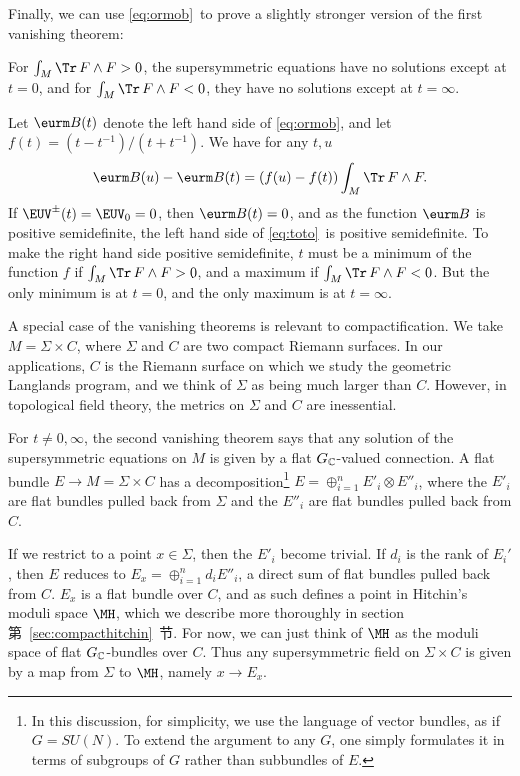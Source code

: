 Finally, we can use \eqref{eq:ormob}\ to prove a slightly stronger version
of the first vanishing theorem:

\par{} For $\int_M\Tr\,
F\wedge F>0$, the supersymmetric equations have no solutions
except at $t=0$, and for $\int_M\Tr\,F\wedge F<0$, they have no
solutions except at $t=\infty$.\par\medskip

Let ${\eurm B}(t)$ denote the left hand side of \eqref{eq:ormob}, and let
$f(t)=(t-t^{-1})/(t+t^{-1})$.  We have for any $t,u$
\setcounter{equation}{33}
\begin{equation}\label{eq:toto}
{\eurm B}(u)-{\eurm B}(t)=(f(u)-f(t))\int_M\Tr \,F\wedge
F.
\end{equation}
 If $\EUV^\pm(t)=\EUV_0=0$, then ${\eurm B}(t)=0$, and as the
function ${\eurm B}$ is positive semidefinite, the left hand side
of \eqref{eq:toto}\ is positive semidefinite. To make the right hand side
positive semidefinite, $t$ must be a minimum of the function $f$
if $\int_M\Tr\, F\wedge F>0$, and a maximum if $\int_M\Tr\,F\wedge
F<0$.  But the only minimum is at $t=0$, and the only maximum is
at $t=\infty$.

\par{}

A special case of the vanishing theorems  is relevant to
compactification.  We take $M=\Sigma\times C$, where $\Sigma$ and
$C$ are two compact Riemann surfaces.  In our applications, $C$ is
the Riemann surface on which we study the geometric Langlands
program, and we think of $\Sigma$ as being much larger than $C$.
However, in topological field theory, the metrics on $\Sigma$ and
$C$ are inessential.

For $t\not=0,\infty$, the second vanishing theorem says that any
solution of the supersymmetric equations on $M$ is given by a flat
$G_{\Bbb{C}}$-valued connection.  A flat bundle $E\to
M=\Sigma\times C$ has a decomposition\footnote{In this discussion, for
simplicity, we use the language of vector bundles, as if
$G=SU(N)$. To extend the argument to any $G$, one simply
formulates it in terms of subgroups of $G$ rather than subbundles
of $E$.} $E=\oplus_{i=1}^n E'_i\otimes E''_i$, where the $E'_i$
are flat bundles pulled back from  $\Sigma$ and the $E''_i$ are
flat bundles pulled back from $C$.

If we restrict to a point $x\in \Sigma$, then the $E'_i$ become
trivial. If $d_i$ is the rank of $E_i'$, then $E$ reduces to
$E_x=\oplus_{i=1}^n d_iE''_i$, a direct sum of flat bundles pulled
back from $C$. $E_x$ is a flat bundle over $C$, and as such
defines a point in Hitchin's moduli space $\MH$, which we describe
more thoroughly in section 第~\ref{sec:compacthitchin}~节. For now, we can just think of $\MH$ as the
moduli space of flat $G_\Bbb{C}$-bundles over $C$.  Thus any
supersymmetric field on $\Sigma\times C$ is given by a map from
$\Sigma$ to $\MH$, namely $x\to E_x$.

